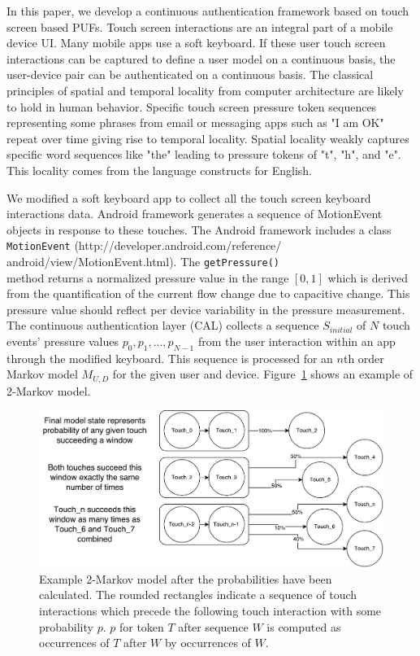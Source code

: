 \documentclass{acm_proc_article-sp}
\begin{document}
In this paper, we develop a continuous authentication framework based on touch screen based PUFs.
Touch screen interactions are an integral part of a mobile device UI. Many mobile apps use a soft keyboard. 
 If these user touch screen interactions can be captured to define a 
user model on a continuous basis, the user-device pair can be authenticated on a continuous
basis. The classical principles of spatial and temporal locality from computer architecture
are likely to hold in human behavior. Specific touch screen pressure token sequences representing
some phrases from email or messaging apps such as "I am OK" repeat over time giving rise
to temporal locality. Spatial locality weakly captures specific word sequences like "the" 
leading to pressure tokens of "t", "h", and "e". This locality comes from the language constructs for
English.

We modified a soft keyboard app to collect all the touch screen keyboard interactions data.
Android framework generates a sequence of MotionEvent objects in response to these touches.
The Android framework includes a class {\tt MotionEvent} (http://developer.android.com/reference/\\android/view/MotionEvent.html). 
The {\tt getPressure()}\\
method returns a normalized pressure value in the
range $[0,1]$ which is derived from the quantification of the current flow change due to
capacitive change. This pressure value
should reflect per device variability in the pressure measurement.
The continuous authentication layer (CAL) collects a sequence $S_{initial}$ of $N$ touch events' pressure
values $p_0, p_1, \dots , p_{N-1}$ from the user interaction within an app through the modified keyboard.
This sequence is processed for an $n$th order Markov model $M_{U, D}$ for the given user and device.
Figure~\ref{fig:final_markov_model_state} shows an example of 2-Markov model.

\begin{figure}
\centering
\includegraphics[width=.45\textwidth]{final_marcov_model_state.pdf}
\caption{
Example 2-Markov model after the probabilities have been calculated.
The rounded rectangles indicate 
a sequence of touch interactions 
which precede the following touch interaction with some probability $p$.
$p$ for token $T$ after sequence $W$ is computed 
as occurrences of $T$ after $W$
by occurrences of $W$.
}
\label{fig:final_markov_model_state}
\end{figure}
\end{document}
